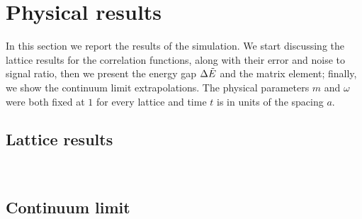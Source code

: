 \section{Physical results}%
\label{sec:physicalresults}
In this section we report the results of the simulation.
We start discussing the lattice results for the correlation functions, along with their error and noise to signal ratio, then we present the energy gap $\Delta \tilde{E}$
and the matrix element; finally, we show the continuum limit
extrapolations. The physical parameters $m$ and $\omega$ were both fixed at $1$ for every lattice and time $t$ is in units of the spacing $a$.
\subsection{Lattice results}%
\label{subsec:correlationfunctions}

\\


\subsection{Continuum limit}%
\label{subsec:continuum limit}


